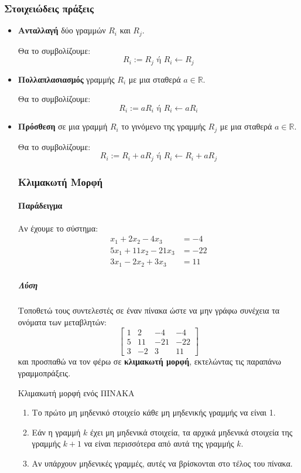\documentclass[11pt,a4paper,notitlepage,fleqn,final]{article}
\begin{document}
\subsubsection{Στοιχειώδεις πράξεις}
\begin{itemize}
	\item \textbf{Ανταλλαγή} δύο γραμμών \( R_i \) και \( R_j \).

	Θα το συμβολίζουμε:
	\[
	R_i := R_j \text{ ή } R_i \leftarrow R_j
	\]
	\item \textbf{Πολλαπλασιασμός} γραμμής \( R_i \) με μια σταθερά
	\( a\in
	\mathbb R  \).

	Θα το συμβολίζουμε:
	\[
	R_i := aR_i \text{ ή } R_i \leftarrow aR_i
	\]

	\item \textbf{Πρόσθεση} σε μια γραμμή \( R_i \) το γινόμενο της
	γραμμής
	\( R_j \) με μια σταθερά \( a \in \mathbb R  \).

	Θα το συμβολίζουμε:
	\[
	R_i := R_i + aR_j \text{ ή } R_i \leftarrow R_i + aR_j
	\]

	\subsubsection{Κλιμακωτή Μορφή}

	\paragraph{Παράδειγμα}
	Αν έχουμε το σύστημα:
	\begin{align*}
		x_1+2x_2-4x_3 &= -4 \\
		5x_1+11x_2-21x_3 &= -22 \\
		3x_1 - 2x_2 + 3x_3 &= 11
	\end{align*}
	\subparagraph{Λύση}
	Τοποθετώ τους συντελεστές σε έναν πίνακα ώστε να μην γράφω συνέχεια
	τα ονόματα των μεταβλητών:
	\[
	\left[\begin{array}{ccc|c}
	1 & 2 & -4 & -4 \\ 5 & 11 & -21 & -22 \\ 3 & -2 & 3 & 11
	\end{array}\right]
	\]
	και προσπαθώ να τον φέρω σε \textbf{κλιμακωτή μορφή},
	εκτελώντας τις παραπάνω γραμμοπράξεις.

	\begin{defn}{Κλιμακωτή μορφή ενός ΠΙΝΑΚΑ}{}
		\begin{enumerate}
			\item Το πρώτο μη μηδενικό στοιχείο κάθε μη μηδενικής γραμμής
			να είναι 1.
			\item Εάν η γραμμή \( k \) έχει μη μηδενικά στοιχεία, τα
			αρχικά μηδενικά στοιχεία της γραμμής \( k+1 \) να είναι
			περισσότερα από αυτά της γραμμής \( k \).
			\item Αν υπάρχουν μηδενικές γραμμές, αυτές να βρίσκονται στο
			τέλος του πίνακα.
		\end{enumerate}
		\tcblower

\end{defn}
\end{itemize}
\end{document}
